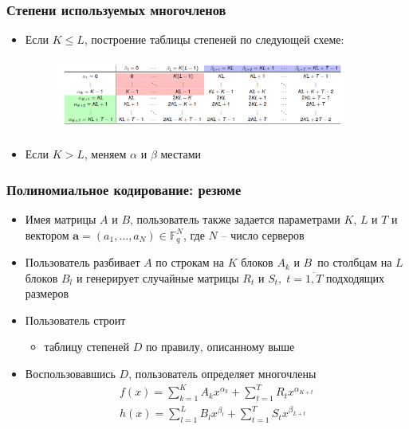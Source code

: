 \documentclass{beamer}
\let\vec\mathbf
\begin{document}
\begin{frame}
    \frametitle{Степени используемых многочленов}
    \begin{itemize}
        \item Если $K \leqslant L$, построение таблицы степеней по следующей схеме:
        \begin{figure}[]
            \centering
            \includegraphics[width=0.9\textwidth]{gasp.png}
        \end{figure}
        \item Если $K > L$, меняем $\alpha$ и $\beta$ местами
    \end{itemize}
\end{frame}

\begin{frame}
    \frametitle{Полиномиальное кодирование: резюме}
    \begin{itemize}
        \item<1-> Имея матрицы $A$ и $B$, пользователь также задается параметрами $K$, $L$ и $T$ и вектором $\vec{a} = \left(a_1, \dots, a_N\right) \in \mathbb{F}^N_q$, где $N$ -- число серверов
        \item<2-> Пользователь разбивает $A$ по строкам на $K$ блоков $A_k$ и $B$~по столбцам на $L$ блоков $B_l$ и генерирует случайные матрицы $R_t$ и $S_t,\; t=\overline{1,T}$ подходящих размеров

        \item<3-> Пользователь строит 
        \begin{itemize}
            \item таблицу степеней $D$ по правилу, описанному выше
        \end{itemize}
        \item<4-> Воспользовавшись $D$, пользователь определяет многочлены 
        \begin{gather*}
            f(x) = \sum_{k=1}^K A_k x^{\alpha_k} + \sum_{t=1}^{T}R_t x^{\alpha_{K+t}} \\
            h(x) = \sum_{l=1}^L B_l x^{\beta_l} + \sum_{t=1}^{T}S_t x^{\beta_{L+t}}
        \end{gather*} 
    \end{itemize}
\end{frame}
\end{document}
